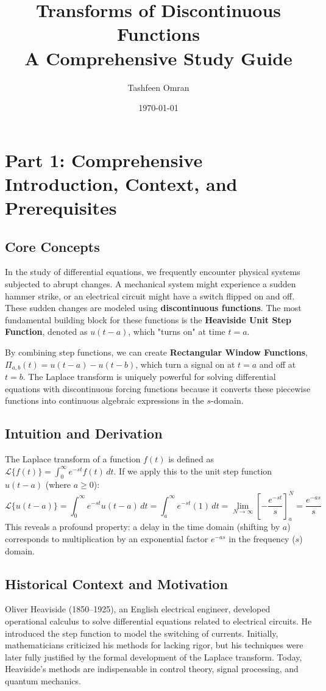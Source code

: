 \documentclass[11pt, letterpaper]{article}
\theoremstyle{definition}
\theoremstyle{remark}
\newcommand{\Lap}{\mathcal{L}}
\begin{document}
\title{\textbf{Transforms of Discontinuous Functions}\\ \Large A Comprehensive Study Guide}
\author{Tashfeen Omran}
\date{\today}
\maketitle

\tableofcontents
\newpage

\section{Part 1: Comprehensive Introduction, Context, and Prerequisites}

\subsection{Core Concepts}
In the study of differential equations, we frequently encounter physical systems subjected to abrupt changes. A mechanical system might experience a sudden hammer strike, or an electrical circuit might have a switch flipped on and off. These sudden changes are modeled using \textbf{discontinuous functions}. The most fundamental building block for these functions is the \textbf{Heaviside Unit Step Function}, denoted as $u(t-a)$, which "turns on" at time $t=a$. 

By combining step functions, we can create \textbf{Rectangular Window Functions}, $\Pi_{a,b}(t) = u(t-a) - u(t-b)$, which turn a signal on at $t=a$ and off at $t=b$. The Laplace transform is uniquely powerful for solving differential equations with discontinuous forcing functions because it converts these piecewise functions into continuous algebraic expressions in the $s$-domain.

\subsection{Intuition and Derivation}
The Laplace transform of a function $f(t)$ is defined as $\Lap\{f(t)\} = \int_0^\infty e^{-st}f(t)\,dt$. 
If we apply this to the unit step function $u(t-a)$ (where $a \ge 0$):
\[
\Lap\{u(t-a)\} = \int_0^\infty e^{-st}u(t-a)\,dt = \int_a^\infty e^{-st}(1)\,dt = \lim_{N \to \infty} \left[ -\frac{e^{-st}}{s} \right]_a^N = \frac{e^{-as}}{s}
\]
This reveals a profound property: a delay in the time domain (shifting by $a$) corresponds to multiplication by an exponential factor $e^{-as}$ in the frequency ($s$) domain.

\subsection{Historical Context and Motivation}
Oliver Heaviside (1850–1925), an English electrical engineer, developed operational calculus to solve differential equations related to electrical circuits. He introduced the step function to model the switching of currents. Initially, mathematicians criticized his methods for lacking rigor, but his techniques were later fully justified by the formal development of the Laplace transform. Today, Heaviside's methods are indispensable in control theory, signal processing, and quantum mechanics.
\end{document}

